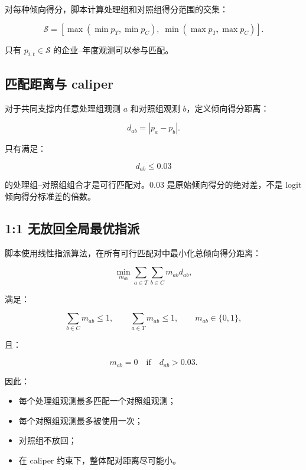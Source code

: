 \documentclass[12pt,a4paper]{article}
\begin{document}
对每种倾向得分，脚本计算处理组和对照组得分范围的交集：

\begin{equation}
\mathcal{S}=\left[
\max\left(\min p_T,\min p_C\right),\;
\min\left(\max p_T,\max p_C\right)
\right].
\end{equation}

只有 $p_{i,t}\in\mathcal{S}$ 的企业--年度观测可以参与匹配。

\subsection{匹配距离与 caliper}

对于共同支撑内任意处理组观测 $a$ 和对照组观测 $b$，定义倾向得分距离：

\begin{equation}
    d_{ab}=|p_a-p_b|.
\end{equation}

只有满足：

\begin{equation}
    d_{ab}\leq 0.03
\end{equation}

的处理组--对照组组合才是可行匹配对。$0.03$ 是原始倾向得分的绝对差，不是 logit 倾向得分标准差的倍数。

\subsection{1:1 无放回全局最优指派}

脚本使用线性指派算法，在所有可行匹配对中最小化总倾向得分距离：

\begin{equation}
    \min_{m_{ab}}\sum_{a\in T}\sum_{b\in C}m_{ab}d_{ab},
\end{equation}

满足：

\begin{equation}
    \sum_{b\in C}m_{ab}\leq 1,\qquad
    \sum_{a\in T}m_{ab}\leq 1,\qquad
    m_{ab}\in\{0,1\},
\end{equation}

且：

\begin{equation}
    m_{ab}=0\quad\text{if}\quad d_{ab}>0.03.
\end{equation}

因此：

\begin{itemize}
    \item 每个处理组观测最多匹配一个对照组观测；
    \item 每个对照组观测最多被使用一次；
    \item 对照组不放回；
    \item 在 caliper 约束下，整体配对距离尽可能小。
\end{itemize}
\end{document}
